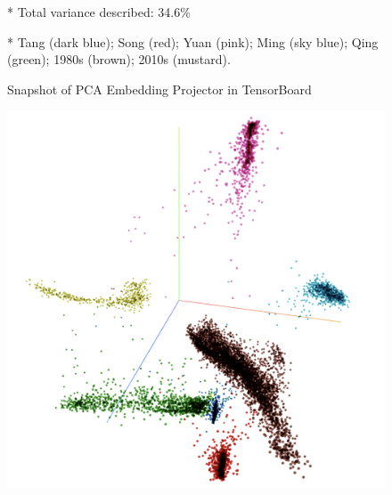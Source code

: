 \begin{figure}[H]
\begin{threeparttable}
\begin{minipage}[b]{0.45\linewidth}
  \end{minipage}
    \begin{tablenotes}
      \linespread{1}\footnotesize
      \item[*]\hspace*{-\fontdimen2\font}Total variance described: 34.6\%
      \item[*]\hspace*{-\fontdimen2\font}Tang (dark blue); Song (red); Yuan (pink); Ming (sky blue); Qing (green); 1980s (brown); 2010s (mustard).
    \end{tablenotes}
  \end{threeparttable}
  \caption{Snapshot of PCA Embedding Projector in TensorBoard}
\end{figure}

\begin{figure}[H]
  \centering
  \begin{threeparttable}
  \begin{minipage}[b]{0.45\linewidth}
    \includegraphics[width=\textwidth]{figures_new/from_old/tsne_embedding_projector_67}
  \end{minipage}
  \quad
  \begin{minipage}[b]{0.45\linewidth}

\end{minipage}
\end{threeparttable}
\end{figure}
